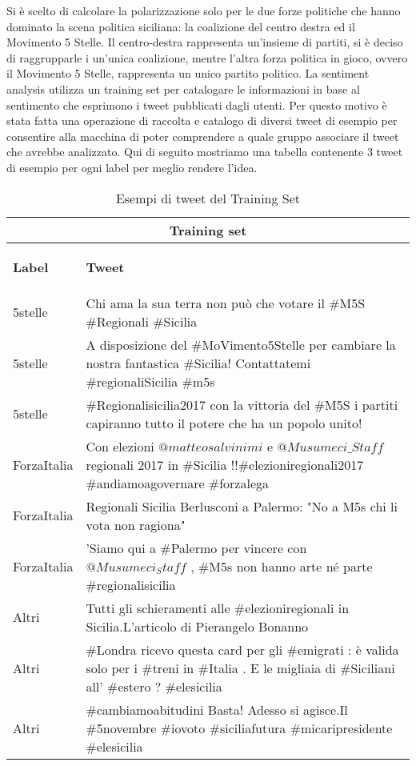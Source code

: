 Si è scelto di calcolare la polarizzazione solo per le due forze politiche che hanno dominato la scena politica siciliana: la coalizione del centro destra  ed il Movimento 5 Stelle. Il centro-destra rappresenta un'insieme di partiti, si è deciso di raggrupparle i un'unica coalizione, mentre l'altra forza politica in gioco, ovvero il Movimento 5 Stelle, rappresenta un unico partito politico.
La sentiment analysis utilizza un training set per catalogare le informazioni in base al sentimento che esprimono i tweet pubblicati dagli utenti. Per questo motivo è stata fatta una operazione di raccolta e catalogo di diversi tweet di esempio per consentire alla macchina di poter comprendere a quale gruppo associare il tweet che avrebbe analizzato.
Qui di seguito mostriamo una tabella contenente 3 tweet di esempio per ogni label per meglio rendere l'idea.
\begin{table}

\begin{tabular}{ |p{3cm}|p{10cm}| }
 \hline
 \multicolumn{2}{|c|}{\textbf{Training set}} \\
 \hline 
 \begin{center}
 \textbf{Label}
 \end{center} & \begin{center}
 \textbf{Tweet}
 \end{center}\\
 \hline
 5stelle   & Chi ama la sua terra non può che votare il \#M5S \#Regionali \#Sicilia  \\ \hline
 5stelle & A disposizione del \#MoVimento5Stelle per cambiare la nostra fantastica \#Sicilia! Contattatemi \#regionaliSicilia \#m5s\\ \hline
 5stelle & \#Regionalisicilia2017 con la vittoria del \#M5S i partiti capiranno tutto il potere che ha un popolo unito! \\ \hline
 ForzaItalia &   Con elezioni $ @matteosalvinimi$ e $@Musumeci\_Staff$ regionali 2017 in \#Sicilia !!\#elezioniregionali2017 \#andiamoagovernare \#forzalega  \\ \hline
 ForzaItalia & Regionali Sicilia  Berlusconi a Palermo: "No a M5s chi li vota non ragiona" \\ \hline
 ForzaItalia & 'Siamo qui a \#Palermo per vincere con $@Musumeci_Staff$ , \#M5s non hanno arte né parte \#regionalisicilia \\ \hline
Altri & Tutti gli schieramenti alle \#elezioniregionali in Sicilia.L'articolo di Pierangelo Bonanno \\ \hline
Altri & \#Londra ricevo questa card per gli \#emigrati : è valida solo per i \#treni in \#Italia . E le migliaia di \#Siciliani all' \#estero ? \#elesicilia \\ \hline
Altri & \#cambiamoabitudini Basta! Adesso si agisce.Il \#5novembre \#iovoto \#siciliafutura \#micaripresidente \#elesicilia\\
 \hline
\end{tabular}
\caption{Esempi di tweet del Training Set}
 \label{trainingSetExample}
\end{table}

